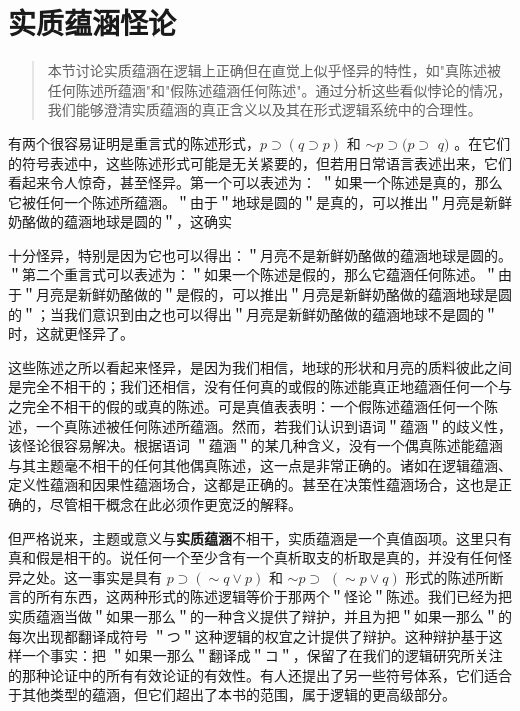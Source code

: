 \section{实质蕴涵怪论}

\begin{quotation}
本节讨论实质蕴涵在逻辑上正确但在直觉上似乎怪异的特性，如"真陈述被任何陈述所蕴涵"和"假陈述蕴涵任何陈述"。通过分析这些看似悖论的情况，我们能够澄清实质蕴涵的真正含义以及其在形式逻辑系统中的合理性。
\end{quotation}

有两个很容易证明是重言式的陈述形式，$p \supset(q \supset p)$ 和 $\sim p \supset(p \supset$ $q)$ 。在它们的符号表述中，这些陈述形式可能是无关紧要的，但若用日常语言表述出来，它们看起来令人惊奇，甚至怪异。第一个可以表述为： ＂如果一个陈述是真的，那么它被任何一个陈述所蕴涵。＂由于＂地球是圆的＂是真的，可以推出＂月亮是新鲜奶酪做的蕴涵地球是圆的＂，这确实

十分怪异，特别是因为它也可以得出：＂月亮不是新鲜奶酪做的蕴涵地球是圆的。＂第二个重言式可以表述为：＂如果一个陈述是假的，那么它蕴涵任何陈述。＂由于＂月亮是新鲜奶酪做的＂是假的，可以推出＂月亮是新鲜奶酪做的蕴涵地球是圆的＂；当我们意识到由之也可以得出＂月亮是新鲜奶酪做的蕴涵地球不是圆的＂时，这就更怪异了。

这些陈述之所以看起来怪异，是因为我们相信，地球的形状和月亮的质料彼此之间是完全不相干的；我们还相信，没有任何真的或假的陈述能真正地蕴涵任何一个与之完全不相干的假的或真的陈述。可是真值表表明：一个假陈述蕴涵任何一个陈述，一个真陈述被任何陈述所蕴涵。然而，若我们认识到语词＂蕴涵＂的歧义性，该怪论很容易解决。根据语词 ＂蕴涵＂的某几种含义，没有一个偶真陈述能蕴涵与其主题毫不相干的任何其他偶真陈述，这一点是非常正确的。诸如在逻辑蕴涵、定义性蕴涵和因果性蕴涵场合，这都是正确的。甚至在决策性蕴涵场合，这也是正确的，尽管相干概念在此必须作更宽泛的解释。

但严格说来，主题或意义与\textbf{实质蕴涵}不相干，实质蕴涵是一个真值函项。这里只有真和假是相干的。说任何一个至少含有一个真析取支的析取是真的，并没有任何怪异之处。这一事实是具有 $p \supset(\sim q \vee p)$ 和 $\sim p \supset$ $(\sim p \vee q)$ 形式的陈述所断言的所有东西，这两种形式的陈述逻辑等价于那两个＂怪论＂陈述。我们已经为把实质蕴涵当做＂如果一那么＂的一种含义提供了辩护，并且为把＂如果一那么＂的每次出现都翻译成符号 ＂つ＂这种逻辑的权宜之计提供了辩护。这种辩护基于这样一个事实：把 ＂如果一那么＂翻译成＂コ＂，保留了在我们的逻辑研究所关注的那种论证中的所有有效论证的有效性。有人还提出了另一些符号体系，它们适合于其他类型的蕴涵，但它们超出了本书的范围，属于逻辑的更高级部分。 


